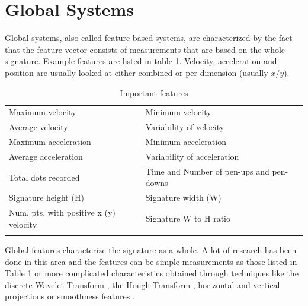 \documentclass[a4paper, oneside]{csthesis}
\begin{document}
\section{Global Systems}
\label{sec:features}

Global systems, also called feature-based systems, are characterized by the fact that the feature vector consists of measurements that are based on the whole signature. Example features are listed in table \ref{fig:global-features}. Velocity, acceleration and position are usually looked at either combined or per dimension (usually $x/y$).



\begin{table}[tb]
    \begin{center}
        \begin{tabular}{p{6cm}|p{6cm}}

Maximum velocity & Minimum velocity \\ \hdashline[0.5pt/3pt]
Average velocity & Variability of velocity  \\ \hdashline[0.5pt/3pt]
Maximum acceleration & Minimum acceleration \\ \hdashline[0.5pt/3pt]
Average acceleration & Variability of acceleration  \\ \hdashline[0.5pt/3pt]
Total dots recorded & Time and Number of pen-ups and pen-downs \\ \hdashline[0.5pt/3pt]
Signature height (H) & Signature width (W) \\ \hdashline[0.5pt/3pt]
Num. pts. with positive x (y) velocity & Signature W to H ratio \\ \hdashline[0.5pt/3pt]
\hline
        \end{tabular}
    \end{center}
\caption{Important features}
\label{fig:global-features}
\end{table}


Global features characterize the signature as a whole. A lot of research has been done in this area and the features can be simple measurements as those listed in Table \ref{fig:global-features} or more complicated characteristics obtained through techniques like the discrete Wavelet Transform \cite{ji2005signature}, the Hough Transform \cite{kaewkongka1999off}, horizontal and vertical projections \cite{fang2003off} or smoothness features \cite{fang2001offline}.

\end{document}
